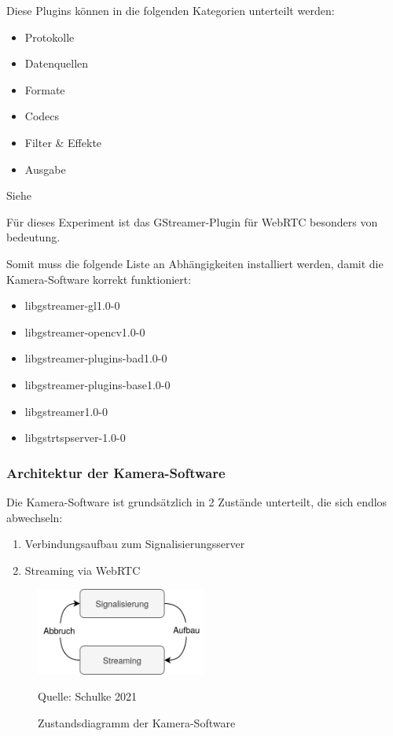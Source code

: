 \documentclass{article}
\newcommand{\figuresource}[1]{
	\begin{center}Quelle: #1\end{center}
}
\begin{document}
\begin{onecolumn}
Diese Plugins können in die folgenden Kategorien unterteilt werden:

\begin{itemize}
	\item Protokolle
	\item Datenquellen
	\item Formate
	\item Codecs
	\item Filter \& Effekte
	\item Ausgabe
\end{itemize}

Siehe~\cite{GStreamerManualIntro}


Für dieses Experiment ist das GStreamer-Plugin für WebRTC besonders von
bedeutung.

Somit muss die folgende Liste an Abhängigkeiten installiert werden, damit die
Kamera-Software korrekt funktioniert:

\begin{itemize}
	\item libgstreamer-gl1.0-0
	\item libgstreamer-opencv1.0-0
	\item libgstreamer-plugins-bad1.0-0
	\item libgstreamer-plugins-base1.0-0
	\item libgstreamer1.0-0
	\item libgstrtspserver-1.0-0
\end{itemize}

\subsubsection{Architektur der Kamera-Software}

Die Kamera-Software ist grundsätzlich in 2 Zustände unterteilt, die sich endlos
abwechseln:

\begin{enumerate}
	\item Verbindungsaufbau zum Signalisierungsserver
	\item Streaming via WebRTC
\end{enumerate}

\begin{figure}[ht]
	\includegraphics[width=0.5\textwidth]{diagram-states}
	\centering
	\caption{Zustandsdiagramm der Kamera-Software}
	\figuresource{Schulke 2021}
\end{figure}


\end{onecolumn}
\end{document}
